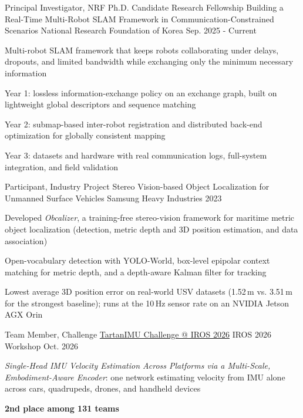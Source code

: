 
\begin{cventries}
  \cventry
    {Principal Investigator, NRF Ph.D. Candidate Research Fellowship}
    {Building a Real-Time Multi-Robot SLAM Framework in Communication-Constrained Scenarios}
    {National Research Foundation of Korea}
    {Sep. 2025 - Current}
    {
      \begin{cvitems}
        \item Multi-robot SLAM framework that keeps robots collaborating under delays, dropouts, and limited bandwidth while exchanging only the minimum necessary information
        \item Year 1: lossless information-exchange policy on an exchange graph, built on lightweight global descriptors and sequence matching
        \item Year 2: submap-based inter-robot registration and distributed back-end optimization for globally consistent mapping
        \item Year 3: datasets and hardware with real communication logs, full-system integration, and field validation
      \end{cvitems}
    }

  \cventry
    {Participant, Industry Project}
    {Stereo Vision-based Object Localization for Unmanned Surface Vehicles}
    {Samsung Heavy Industries}
    {2023}
    {
      \begin{cvitems}
        \item Developed \textit{Obcalizer}, a training-free stereo-vision framework for maritime metric object localization (detection, metric depth and 3D position estimation, and data association)
        \item Open-vocabulary detection with YOLO-World, box-level epipolar context matching for metric depth, and a depth-aware Kalman filter for tracking
        \item Lowest average 3D position error on real-world USV datasets (1.52\,m vs. 3.51\,m for the strongest baseline); runs at the 10\,Hz sensor rate on an NVIDIA Jetson AGX Orin
      \end{cvitems}
    }

  \cventry
    {Team Member, Challenge}
    {\href{https://sparolab.github.io/research/imu_challenge/}{TartanIMU Challenge @ IROS 2026}}
    {IROS 2026 Workshop}
    {Oct. 2026}
    {
      \begin{cvitems}
        \item \textit{Single-Head IMU Velocity Estimation Across Platforms via a Multi-Scale, Embodiment-Aware Encoder}: one network estimating velocity from IMU alone across cars, quadrupeds, drones, and handheld devices
        \item \textbf{2nd place among 131 teams}
      \end{cvitems}
    }


\end{cventries}
